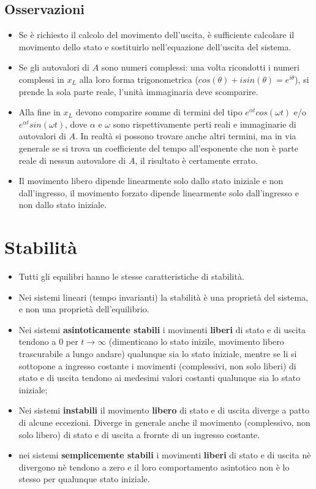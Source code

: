 \begin{landscape}
\begin{multicols*}{3}
    \subsection{Osservazioni}
    \begin{itemize}
        \item Se è richiesto il calcolo del movimento dell'uscita, è sufficiente calcolare il movimento dello stato e sostituirlo nell'equazione dell'uscita del sistema.
        \item Se gli autovalori di $A$ sono numeri complessi: una volta ricondotti i numeri complessi in $x_L$ alla loro forma trigonometrica ($cos(\theta) + i sin(\theta) = e^{i \theta}$), si prende la sola parte reale, l'unità immaginaria deve scomparire.
        \item Alla fine in $x_L$ devono comparire somme di termini del tipo $e^{\alpha t} cos(\omega t)$ e/o $e^{\alpha t} sin(\omega t)$, dove $\alpha$ e $\omega$ sono rispettivamente perti reali e immaginarie di autovalori di $A$. In realtà si possono trovare anche altri termini, ma in via generale se si trova un coefficiente del tempo all'esponente che non è parte reale di nessun autovalore di $A$, il risultato è certamente errato.
        \item Il movimento libero dipende linearmente solo dallo stato iniziale e non dall’ingresso, il movimento forzato dipende linearmente solo dall’ingresso e non dallo stato iniziale.
    \end{itemize}
    \newpage\section{Stabilità}
    \begin{itemize}
        \item Tutti gli equilibri hanno le stesse caratteristiche di stabilità.
        \item Nei sistemi lineari (tempo invarianti) la stabilità è una proprietà del sistema, e non una proprietà dell’equilibrio. 
        \item Nei sistemi \textbf{asintoticamente stabili} i movimenti \textbf{liberi} di stato e di uscita tendono a $0$ per $t \rightarrow \infty$ (dimenticano lo stato inizile, movimento libero trascurabile a lungo andare) qualunque sia lo stato iniziale, mentre se li si sottopone a ingresso costante i movimenti (complessivi, non solo liberi) di stato e di uscita tendono ai medesimi valori costanti qualunque sia lo stato iniziale;
        \item Nei sistemi \textbf{instabili} il movimento \textbf{libero} di stato e di uscita diverge a patto di alcune eccezioni. Diverge in generale anche il movimento (complessivo, non solo libero) di stato e di uscita a frornte di un ingresso costante.
        \item nei sistemi \textbf{semplicemente stabili} i movimenti \textbf{liberi} di stato e di uscita nè divergono nè tendono a zero e il loro comportamento asintotico non è lo stesso per qualunque stato iniziale.
    \end{itemize}

\end{multicols*}
\end{landscape}

